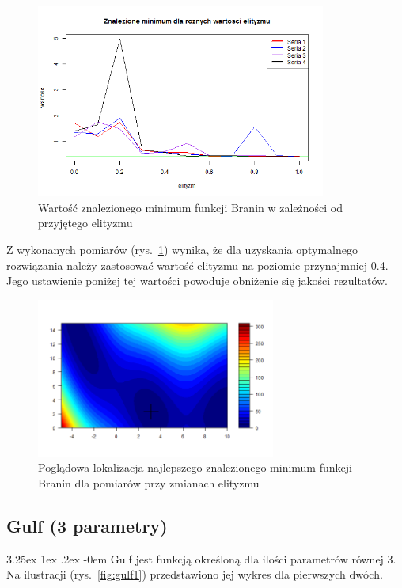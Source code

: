 \documentclass[11pt, a4paper]{article}
\makeatletter
\newcommand{\fbi}{\leavevmode{\parindent=1em\indent}}
\renewcommand\paragraph{\@startsection{paragraph}{5}{\z@}
  {3.25ex \@plus1ex \@minus.2ex}
  {-0em}
  {\normalfont\normalsize\bfseries}}
\makeatother
\begin{document}
\begin{figure}[H]
	\centering
	\includegraphics[width=0.85\textwidth]{./assets/Branin6.png}
	\caption{Wartość znalezionego minimum funkcji Branin w zależności od przyjętego elityzmu}
	\label{fig:branin6}
\end{figure}

\fbi
Z wykonanych pomiarów (rys.~\ref{fig:branin6}) wynika, że dla uzyskania optymalnego rozwiązania należy zastosować wartość elityzmu na poziomie przynajmniej 0.4. Jego ustawienie poniżej tej wartości powoduje obniżenie się jakości rezultatów.

\begin{figure}[H]
	\centering
	\includegraphics[width=0.7\textwidth]{./assets/Branin6elt.png}
	\caption{Poglądowa lokalizacja najlepszego znalezionego minimum funkcji Branin dla pomiarów przy zmianach elityzmu}
	\label{fig:branin6elt}
\end{figure}

\newpage
\subsection{Gulf (3 parametry)}
\paragraph{}
Gulf jest funkcją określoną dla ilości parametrów równej 3. Na ilustracji (rys.~\ref{fig:gulf1}) przedstawiono jej wykres dla pierwszych dwóch.
\end{document}

